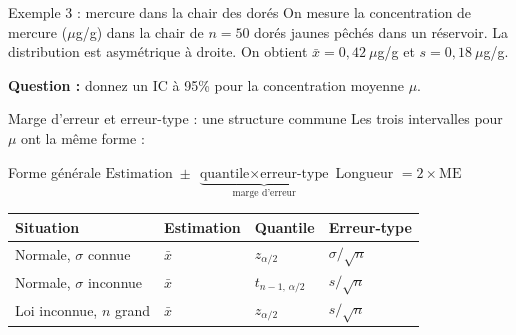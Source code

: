 \documentclass{BeamerTemplate}
\begin{document}
\begin{frame}[t]{Exemple 3 : mercure dans la chair des dorés}
  On mesure la concentration de mercure ($\mu$g/g) dans la chair de $n = 50$ dorés jaunes pêchés dans un réservoir. La distribution est asymétrique à droite.
  On obtient $\bar{x} = 0{,}42\ \mu$g/g et $s = 0{,}18\ \mu$g/g.

  \medskip
  \textbf{Question :} donnez un IC à 95\% pour la concentration moyenne $\mu$.

  \medskip

  \medskip
\end{frame}

\begin{frame}[t]{Marge d'erreur et erreur-type : une structure commune}
  Les trois intervalles pour $\mu$ ont la même forme :
  \begin{Boite}{Forme générale}
    \centering
    $\text{Estimation} \;\pm\; \underbrace{\text{quantile} \times \text{erreur-type}}_{\text{marge d'erreur}}$
    \qquad Longueur $= 2 \times \text{ME}$
  \end{Boite}

  \vspace{-3mm}
  \centering
  \small
  \renewcommand{\arraystretch}{1.2}
  \begin{tabular}{llll}\toprule
    \textbf{Situation} & \textbf{Estimation} & \textbf{Quantile} & \textbf{Erreur-type} \\ \midrule
    Normale, $\sigma$ connue & $\bar{x}$ & $z_{\alpha/2}$ & $\sigma/\sqrt{n}$ \\
    Normale, $\sigma$ inconnue & $\bar{x}$ & $t_{n-1,\,\alpha/2}$ & $s/\sqrt{n}$ \\
    Loi inconnue, $n$ grand & $\bar{x}$ & $z_{\alpha/2}$ & $s/\sqrt{n}$ \\ \bottomrule
  \end{tabular}

  \raggedright
  \smallskip
\end{frame}
\end{document}
